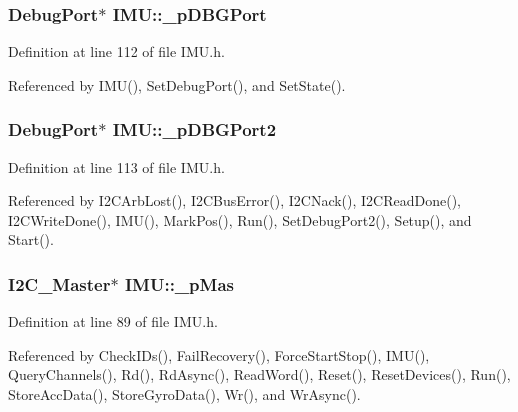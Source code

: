 \hypertarget{class_i_m_u_a83a2ffaf84cc04f17ff0301181c45366}{
\subsubsection[{\_\-pDBGPort}]{\setlength{\rightskip}{0pt plus 5cm}DebugPort$\ast$ {\bf IMU::\_\-pDBGPort}}}
\label{class_i_m_u_a83a2ffaf84cc04f17ff0301181c45366}


Definition at line 112 of file IMU.h.



Referenced by IMU(), SetDebugPort(), and SetState().

\hypertarget{class_i_m_u_a1cf5672a28049d5885a2958010188928}{
\subsubsection[{\_\-pDBGPort2}]{\setlength{\rightskip}{0pt plus 5cm}DebugPort$\ast$ {\bf IMU::\_\-pDBGPort2}}}
\label{class_i_m_u_a1cf5672a28049d5885a2958010188928}


Definition at line 113 of file IMU.h.



Referenced by I2CArbLost(), I2CBusError(), I2CNack(), I2CReadDone(), I2CWriteDone(), IMU(), MarkPos(), Run(), SetDebugPort2(), Setup(), and Start().

\hypertarget{class_i_m_u_a466148932203b7250c83a4c5bb684ca1}{
\subsubsection[{\_\-pMas}]{\setlength{\rightskip}{0pt plus 5cm}I2C\_\-Master$\ast$ {\bf IMU::\_\-pMas}}}
\label{class_i_m_u_a466148932203b7250c83a4c5bb684ca1}


Definition at line 89 of file IMU.h.



Referenced by CheckIDs(), FailRecovery(), ForceStartStop(), IMU(), QueryChannels(), Rd(), RdAsync(), ReadWord(), Reset(), ResetDevices(), Run(), StoreAccData(), StoreGyroData(), Wr(), and WrAsync().

